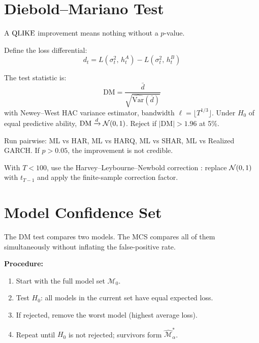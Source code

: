 \section{Diebold--Mariano Test}
\label{sec:dm-test}

A $\operatorname{QLIKE}$ improvement means nothing without a $p$-value.

Define the loss differential:
\begin{equation}
\label{eq:dm-loss-diff}
d_t = L(\sigma^2_t,\, h^A_t) - L(\sigma^2_t,\, h^B_t)
\end{equation}

The test statistic is:
\begin{equation}
\label{eq:dm-stat}
\mathrm{DM} = \frac{\bar{d}}{\sqrt{\widehat{\mathrm{Var}}(\bar{d})}}
\end{equation}
with Newey--West HAC variance estimator, bandwidth $\ell = \lfloor T^{1/3} \rfloor$.
Under $H_0$ of equal predictive ability, $\mathrm{DM} \xrightarrow{d} \mathcal{N}(0,1)$.
Reject if $|\mathrm{DM}| > 1.96$ at 5\%.

\begin{keyidea}
Run pairwise: ML vs HAR, ML vs HARQ, ML vs SHAR, ML vs Realized GARCH.
If $p > 0.05$, the improvement is not credible.
\end{keyidea}

\begin{warning}
With $T < 100$, use the Harvey--Leybourne--Newbold correction \citep{HarveyLeybourneNewbold1997}: replace $\mathcal{N}(0,1)$ with $t_{T-1}$ and apply the finite-sample correction factor.
\end{warning}


\section{Model Confidence Set}
\label{sec:mcs}

The DM test compares two models.
The MCS compares all of them simultaneously without inflating the false-positive rate.

\textbf{Procedure:}
\begin{enumerate}[nosep]
  \item Start with the full model set $\mathcal{M}_0$.
  \item Test $H_0$: all models in the current set have equal expected loss.
  \item If rejected, remove the worst model (highest average loss).
  \item Repeat until $H_0$ is not rejected; survivors form $\widehat{\mathcal{M}}^*_\alpha$.
\end{enumerate}


